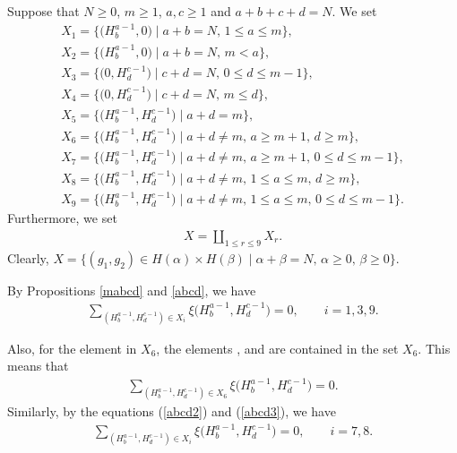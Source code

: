 \documentclass[10pt,a4paper]{amsart}
\numberwithin{equation}{section}
\begin{document}
Suppose that $N\geq0$, $m\geq1$, $a,c\geq1$ and $a+b+c+d=N$. We set
\begin{gather*}
X_1=\bigl\{\bigl(H^{a-1}_{b},0\bigr)\mid a+b=N,\, 1\leq a \leq m\bigr\},%
\\
X_2=\bigl\{\bigl(H^{a-1}_{b},0\bigr)\mid a+b=N,\, m<a\bigr\},
\\
X_3=\bigl\{\bigl(0,H^{c-1}_{d}\bigr)\mid c+d=N,\, 0\leq d \leq m-1\bigr\},%
\\
X_4=\bigl\{\bigl(0,H^{c-1}_{d}\bigr)\mid c+d=N,\, m\leq d\bigr\},
\\
X_5=\bigl\{\bigl(H^{a-1}_{b},H^{c-1}_{d}\bigr)\mid a+d=m\bigr\},%
\\
X_6=\bigl\{\bigl(H^{a-1}_{b},H^{c-1}_{d}\bigr)\mid a+d\ne m,\,a\geq m+1,\, d\geq m\bigr\},%
\\
X_7=\bigl\{\bigl(H^{a-1}_{b},H^{c-1}_{d}\bigr)\mid a+d\ne m,\,a\geq m+1,\,0\leq d \leq m-1\bigr\},%
\\
X_8=\bigl\{\bigl(H^{a-1}_{b},H^{c-1}_{d}\bigr)\mid a+d\ne m,\,1\leq a\leq m,\,d\geq m\bigr\},%
\\
X_9=\bigl\{\bigl(H^{a-1}_{b},H^{c-1}_{d}\bigr)\mid a+d\ne m,\,1\leq a\leq m,\,0\leq d \leq m-1\bigr\}.%
\end{gather*}
Furthermore, we set
\begin{gather*}
X=\coprod_{1\leq r\leq 9}X_{r}.%
\end{gather*}
Clearly,
$X=\{(g_1,g_2)\in H(\alpha)\times H(\beta)\mid \alpha+\beta=N,\, \alpha\geq 0,\, \beta \geq 0\}$.%


By Propositions \ref{mabcd} and \ref{abcd}, we have
\begin{gather*}
\sum_{(H^{a-1}_{b},H^{c-1}_{d})\in X_i}\xi\bigl(H^{a-1}_{b},H^{c-1}_{d}\bigr)=0,\qquad i=1,3,9.
\end{gather*}


Also, for the element  in $X_6$, the elements ,  and  are contained in the set $X_6$. This means that
\begin{gather*}
\sum_{(H^{a-1}_{b},H^{c-1}_{d})\in X_6}\xi\bigl(H^{a-1}_{b},H^{c-1}_{d}\bigr)=0.
\end{gather*}
Similarly, by the equations (\ref{abcd2}) and (\ref{abcd3}), we have
\begin{gather*}
\sum_{(H^{a-1}_{b},H^{c-1}_{d})\in X_i}\xi\bigl(H^{a-1}_{b},H^{c-1}_{d}\bigr)=0,\qquad i=7, 8.
\end{gather*}
\end{document}
